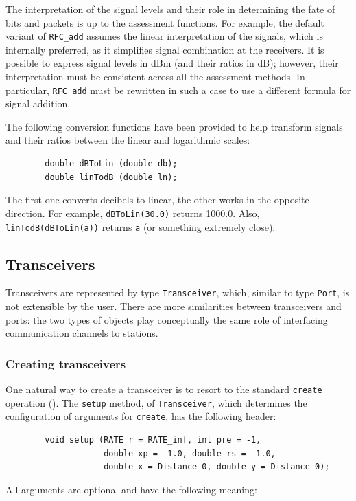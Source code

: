 The interpretation of the signal levels and their role in determining the fate
of bits and packets is up to the assessment functions. 
For example, the default variant of {\tt RFC\_add} assumes the linear
interpretation of the signals, which is internally preferred,
as it simplifies signal combination at the receivers.
It is possible to express signal levels in dBm (and their ratios in dB);
however, their interpretation must be consistent across all the
assessment methods.
In particular, {\tt RFC\_add} must be rewritten in such a case to use a
different formula for signal addition.

The following conversion functions have been provided to help transform
signals and their ratios between the linear and logarithmic scales:

\begin{verbatim}
        double dBToLin (double db);
        double linTodB (double ln);
\end{verbatim}

\noindent
The first one converts decibels to linear, the other works in the opposite
direction.
For example, {\tt dBToLin(30.0)} returns 1000.0.
Also, {\tt linTodB(dBToLin(a))} returns {\tt a} (or something extremely close).

\subsection{Transceivers}
\label{rm_to_tr}

Transceivers are represented by type {\tt Transceiver}, which, similar to
type {\tt Port}, is not extensible by the user.
There are more similarities between transceivers and ports: the two types
of objects play conceptually the same role of interfacing communication
channels to stations.

\subsubsection{Creating transceivers}
\label{rm_to_tr_cr}

One natural way to create a transceiver is to resort to the standard
{\tt create} operation ().
The {\tt setup} method, of {\tt Transceiver},
which determines the configuration of arguments for
{\tt create}, has the following header:
\begin{verbatim}
        void setup (RATE r = RATE_inf, int pre = -1,
                    double xp = -1.0, double rs = -1.0,
                    double x = Distance_0, double y = Distance_0);
\end{verbatim}
\noindent
All arguments are optional and have the following meaning:

